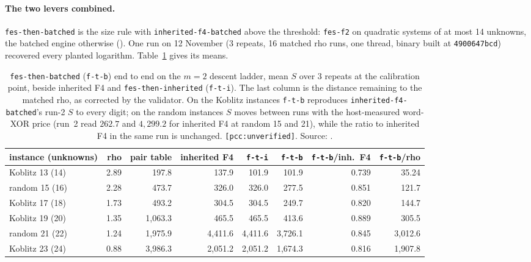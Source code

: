 \paragraph{The two levers combined.} \texttt{fes-then-batched} is the size
rule with \texttt{inherited-f4-batched} above the threshold: \texttt{fes-f2}
on quadratic systems of at most 14 unknowns, the batched engine otherwise
(). One run on 12
November (3 repeats, 16 matched rho runs, one thread, binary built at
\texttt{4900647bcd}) recovered every planted logarithm.
Table~\ref{tab:bo-ftb} gives its means.

\begin{table}[t]
\centering\small
\begin{tabular}{@{}lrrrrrrr@{}}
\toprule
instance (unknowns) & rho & pair table & inherited F4 & \texttt{f-t-i} & \texttt{f-t-b} & \texttt{f-t-b}/inh.\ F4 & \texttt{f-t-b}/rho \\
\midrule
Koblitz 13 (14) & 2.89 & 197.8 & 137.9 & 101.9 & 101.9 & 0.739 & 35.24 \\
random 15 (16) & 2.28 & 473.7 & 326.0 & 326.0 & 277.5 & 0.851 & 121.7 \\
Koblitz 17 (18) & 1.73 & 493.2 & 304.5 & 304.5 & 249.7 & 0.820 & 144.7 \\
Koblitz 19 (20) & 1.35 & 1{,}063.3 & 465.5 & 465.5 & 413.6 & 0.889 & 305.5 \\
random 21 (22) & 1.24 & 1{,}975.9 & 4{,}411.6 & 4{,}411.6 & 3{,}726.1 & 0.845 & 3{,}012.6 \\
Koblitz 23 (24) & 0.88 & 3{,}986.3 & 2{,}051.2 & 2{,}051.2 & 1{,}674.3 & 0.816 & 1{,}907.8 \\
\bottomrule
\end{tabular}
\caption[]{\texttt{fes-then-batched} (\texttt{f-t-b}) end to end on the
$m=2$ descent ladder, mean $S$ over 3 repeats at the calibration point,
beside inherited F4 and \texttt{fes-then-inherited} (\texttt{f-t-i}). The
last column is the distance remaining to the matched rho, as corrected by
the validator. On the Koblitz instances \texttt{f-t-b} reproduces
\texttt{inherited-f4-batched}'s run-2 $S$ to every digit; on the random
instances $S$ moves between runs with the host-measured word-XOR price
(run~2 read $262.7$ and $4{,}299.2$ for inherited F4 at random 15 and 21),
while the ratio to inherited F4 in the same run is unchanged.
\texttt{[pcc:unverified]}. Source:
.}
\label{tab:bo-ftb}
\end{table}

